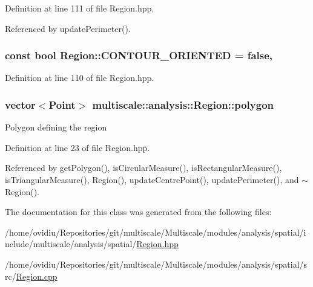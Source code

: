 Definition at line 111 of file Region.\-hpp.



Referenced by update\-Perimeter().

\hypertarget{classmultiscale_1_1analysis_1_1Region_a875a0f14dacf6904cabfa1f31020e6e2}{
\subsubsection[{C\-O\-N\-T\-O\-U\-R\-\_\-\-O\-R\-I\-E\-N\-T\-E\-D}]{\setlength{\rightskip}{0pt plus 5cm}const bool Region\-::\-C\-O\-N\-T\-O\-U\-R\-\_\-\-O\-R\-I\-E\-N\-T\-E\-D = false\hspace{0.3cm}{\ttfamily [static]}, {\ttfamily [private]}}}\label{classmultiscale_1_1analysis_1_1Region_a875a0f14dacf6904cabfa1f31020e6e2}


Definition at line 110 of file Region.\-hpp.

\hypertarget{classmultiscale_1_1analysis_1_1Region_a40d1b47f30bb09c6a47521a968163b6d}{
\subsubsection[{polygon}]{\setlength{\rightskip}{0pt plus 5cm}vector$<$Point$>$ multiscale\-::analysis\-::\-Region\-::polygon\hspace{0.3cm}{\ttfamily [private]}}}\label{classmultiscale_1_1analysis_1_1Region_a40d1b47f30bb09c6a47521a968163b6d}
Polygon defining the region 

Definition at line 23 of file Region.\-hpp.



Referenced by get\-Polygon(), is\-Circular\-Measure(), is\-Rectangular\-Measure(), is\-Triangular\-Measure(), Region(), update\-Centre\-Point(), update\-Perimeter(), and $\sim$\-Region().



The documentation for this class was generated from the following files\-:\begin{DoxyCompactItemize}
\item 
/home/ovidiu/\-Repositories/git/multiscale/\-Multiscale/modules/analysis/spatial/include/multiscale/analysis/spatial/\hyperlink{Region_8hpp}{Region.\-hpp}\item 
/home/ovidiu/\-Repositories/git/multiscale/\-Multiscale/modules/analysis/spatial/src/\hyperlink{Region_8cpp}{Region.\-cpp}\end{DoxyCompactItemize}
